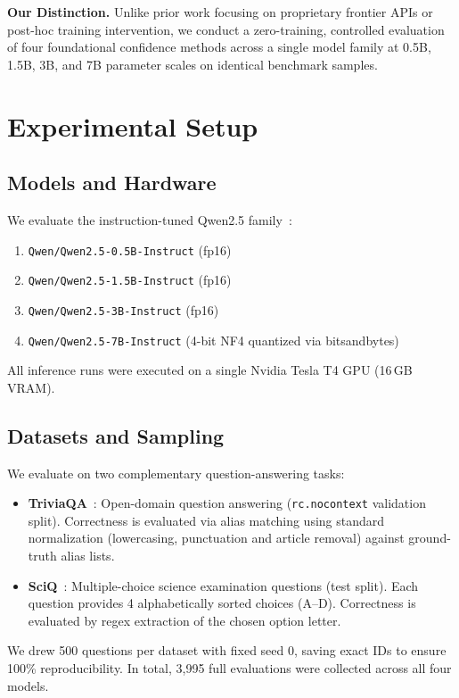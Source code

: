 \documentclass[10pt,twocolumn]{article}
\begin{document}
\textbf{Our Distinction.} Unlike prior work focusing on proprietary frontier APIs or post-hoc training intervention, we conduct a zero-training, controlled evaluation of four foundational confidence methods across a single model family at 0.5B, 1.5B, 3B, and 7B parameter scales on identical benchmark samples.

\section{Experimental Setup}

\subsection{Models and Hardware}
We evaluate the instruction-tuned Qwen2.5 family~\cite{qwen2024qwen25}:
\begin{enumerate}
    \item \texttt{Qwen/Qwen2.5-0.5B-Instruct} (fp16)
    \item \texttt{Qwen/Qwen2.5-1.5B-Instruct} (fp16)
    \item \texttt{Qwen/Qwen2.5-3B-Instruct} (fp16)
    \item \texttt{Qwen/Qwen2.5-7B-Instruct} (4-bit NF4 quantized via bitsandbytes)
\end{enumerate}
All inference runs were executed on a single Nvidia Tesla T4 GPU (16\,GB VRAM).

\subsection{Datasets and Sampling}
We evaluate on two complementary question-answering tasks:
\begin{itemize}
    \item \textbf{TriviaQA}~\cite{joshi2017triviaqa}: Open-domain question answering (\texttt{rc.nocontext} validation split). Correctness is evaluated via alias matching using standard normalization (lowercasing, punctuation and article removal) against ground-truth alias lists.
    \item \textbf{SciQ}~\cite{welbl2017crowdsourcing}: Multiple-choice science examination questions (test split). Each question provides 4 alphabetically sorted choices (A--D). Correctness is evaluated by regex extraction of the chosen option letter.
\end{itemize}
We drew 500 questions per dataset with fixed seed 0, saving exact IDs to ensure 100\% reproducibility. In total, 3,995 full evaluations were collected across all four models.
\end{document}
